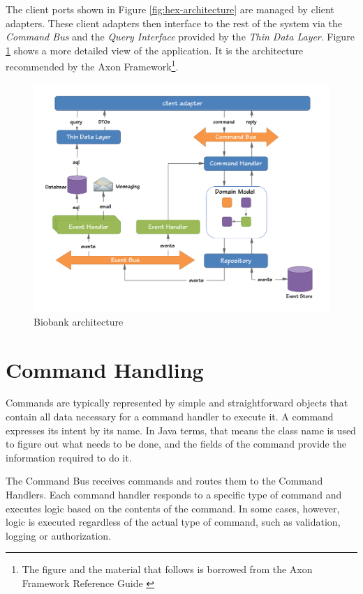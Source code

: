 The client ports shown in Figure \ref{fig:hex-architecture} are managed by
client adapters. These client adapters then interface to the rest of the system
via the \emph{Command Bus} and the \emph{Query Interface} provided by the
\emph{Thin Data Layer}. Figure \ref{fig:cqrs-architecture} shows a more detailed
view of the application. It is the architecture recommended by the Axon
Framework\footnote{The figure and the material that follows is borrowed from
  the Axon Framework Reference Guide \cite{AxonOnline}}.

\begin{figure}[h]
  \begin{center}
    \includegraphics[trim={10mm 5mm 15mm 10mm}, clip, width=1\textwidth]{images/cqrs-architecture}
    \caption{Biobank architecture}
    \label{fig:cqrs-architecture}
  \end{center}
\end{figure}

\section*{Command Handling}

Commands are typically represented by simple and straightforward objects that
contain all data necessary for a command handler to execute it. A command
expresses its intent by its name. In Java terms, that means the class name is
used to figure out what needs to be done, and the fields of the command provide
the information required to do it.

The Command Bus receives commands and routes them to the Command Handlers. Each
command handler responds to a specific type of command and executes logic based
on the contents of the command. In some cases, however, logic is executed
regardless of the actual type of command, such as validation, logging or
authorization.


